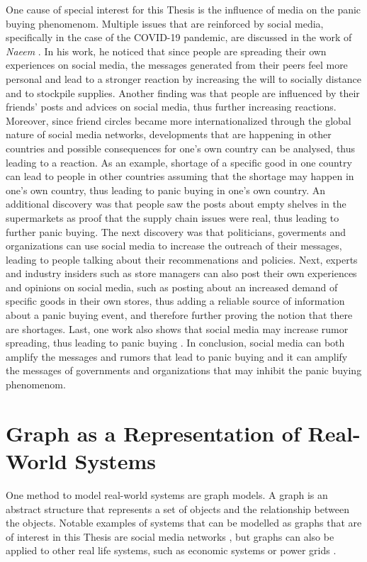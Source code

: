 One cause of special interest for this Thesis is the influence of 
media on the panic buying phenomenom. Multiple issues that are reinforced
by social media, specifically in the case of the COVID-19 pandemic,
are discussed in the work of \textit{Naeem} \cite{naeem2021social}.
In his work, he noticed that since people are spreading their 
own experiences on social media, the messages generated from their peers feel
more personal and lead to a stronger reaction by increasing the will to 
socially distance and to stockpile supplies. Another finding was that people are 
influenced by their friends' posts and advices on social media, thus further
increasing reactions. Moreover, since friend circles became more 
internationalized through the global nature of social media networks,
developments that are happening in other countries and 
possible consequences for one's own country can be analysed, thus
leading to a reaction. As an example,
shortage of a specific good in one country can lead to people in other countries
assuming that the shortage may happen in one's own country, thus leading to 
panic buying in one's own country. An additional discovery was that people saw
the posts about empty shelves in the supermarkets as proof that the supply 
chain issues were real,
thus leading to further panic buying. The next discovery was that politicians,
goverments and organizations can use social media to increase 
the outreach of their messages, leading to people talking about their 
recommenations and policies. Next, experts and industry insiders such as 
store managers can also post their own experiences and opinions on social media,
such as posting about an increased demand of specific goods in their own stores,
thus adding a \glqq reliable\grqq{} source of information about 
a panic buying event, and therefore further proving the notion that there are 
shortages.
Last, one work also shows that social media may increase rumor spreading,
thus leading to panic buying \cite{naeem2022understanding}.
In conclusion, social media can both amplify the messages and rumors that lead to 
panic buying and it can amplify the messages of governments and organizations 
that may inhibit the panic buying phenomenom.



\section{Graph as a Representation of Real-World Systems}
\label{graphbasics}
One method to model real-world systems are graph models.
A graph is an abstract structure that represents a set of objects and the 
relationship between the objects. 
Notable examples of systems that can be modelled as graphs that are of 
interest in this Thesis are social media networks 
\cite{socialgraphexample}, but graphs can 
also be applied to other real life systems, such as economic systems 
\cite{economicsgraph} or power grids \cite{powergraphexample}.


